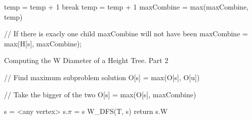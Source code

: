 \begin{algorithm}[h]{}
\begin{algorithmic}[1]
                        \State temp = temp + 1
                        \State break
                    \EndIf
                \EndFor
            \EndIf
                \State temp = temp + 1
            \EndIf
            \State maxCombine = max(maxCombine, temp)
        \EndFor

    // If there is exacly one child maxCombine will not have been
    \State maxCombine = max(H[s], maxCombine);

    \EndFor

\end{algorithmic}
\end{algorithm}

\begin{algorithm}{}
\caption{Computing the W Diameter of a Height Tree. Part 2}
\begin{algorithmic}[1]

    \State // Find maximum subproblem solution
        \State O[s] = max(O[s], O[u])
    \EndFor

    \State // Take the bigger of the two
    \State O[s] = max(O[s], maxCombine)


    \State s = <any vertex>
    \State s.$\pi$ = s
    \State W\_DFS(T, s)
    \State return s.W
\EndFunction

\end{algorithmic}
\end{algorithm}







